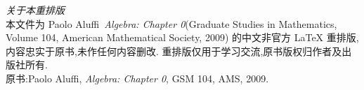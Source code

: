 \thispagestyle{empty}
\begin{center}
    \small
    \noindent\emph{关于本重排版}\\[0.5em]
    本文件为 Paolo Aluffi\ \emph{Algebra: Chapter 0}(Graduate Studies in Mathematics,
    Volume 104, American Mathematical Society, 2009)
    的中文非官方 \LaTeX{} 重排版,\\
    内容忠实于原书,未作任何内容删改.
    重排版仅用于学习交流,原书版权归作者及出版社所有.\\
    \vspace{0.5cm}
    原书:Paolo Aluffi, \textit{Algebra: Chapter 0}, GSM 104, AMS, 2009.
\end{center}

